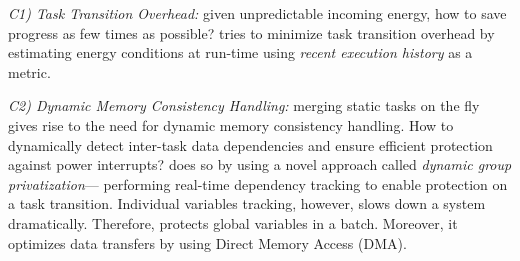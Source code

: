 
\noindent{} \emph{C1) Task Transition Overhead:} given unpredictable incoming energy, how to save progress as few times as possible? \sys tries to minimize task transition overhead by estimating energy conditions at run-time using \emph{recent execution history} as a metric.

\noindent\emph{C2) Dynamic Memory Consistency Handling:} merging static tasks on the fly gives rise to the need for dynamic memory consistency handling. How to dynamically detect inter-task data dependencies and ensure efficient protection against power interrupts? \sys does so by using a novel
approach called \emph{dynamic group privatization}--- %
performing real-time dependency tracking to enable protection on a task transition. Individual variables tracking, however, slows down a system dramatically. Therefore, \sys protects global variables in a batch. Moreover, it optimizes data transfers by using Direct Memory Access (DMA).

